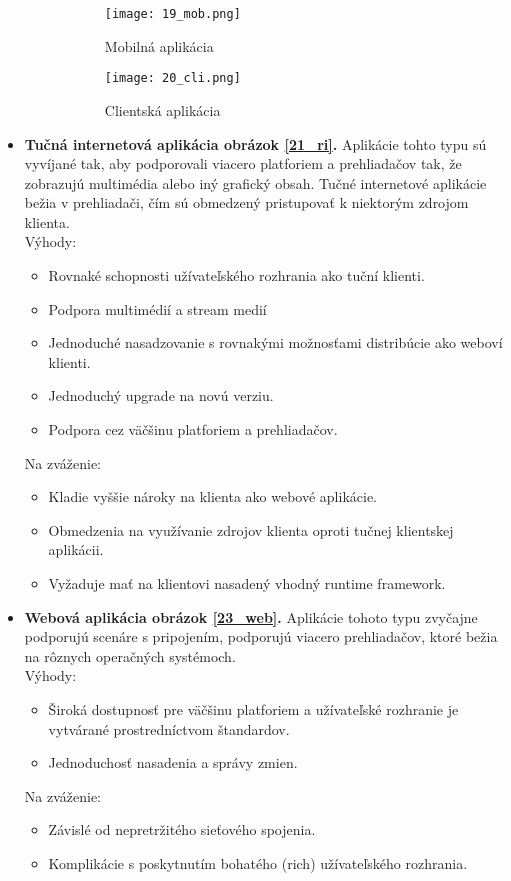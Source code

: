 \begin{itemize}
\begin{figure}[!htbp]
\centering
\begin{subfigure}{0.5\linewidth}
\texttt{[image: 19\_mob.png]}
\caption{Mobilná aplikácia \cite{IOT03}}
\label{19_mob}
\end{subfigure}%
\begin{subfigure}{0.5\linewidth}
\texttt{[image: 20\_cli.png]}
\caption{Clientská aplikácia \cite{IOT03}}
\label{20_cli}
\end{subfigure}
\caption{}
\end{figure}

 
\item
 \textbf{Tučná internetová aplikácia obrázok \ref{21_ri}.} Aplikácie tohto typu sú vyvíjané tak, aby podporovali viacero platforiem a prehliadačov tak, že zobrazujú multimédia alebo iný grafický obsah. Tučné internetové aplikácie bežia v prehliadači, čím sú obmedzený pristupovať k niektorým zdrojom klienta. \\
Výhody: 
 \begin{itemize}
   \item  Rovnaké schopnosti užívateľského rozhrania ako tuční klienti.
   \item  Podpora multimédií a stream medií
   \item  Jednoduché nasadzovanie  s rovnakými možnosťami distribúcie ako weboví klienti. 
   \item Jednoduchý upgrade na novú verziu.
   \item Podpora cez väčšinu platforiem a prehliadačov. 
 \end{itemize}
Na zváženie: 
 \begin{itemize}
   \item Kladie vyššie nároky na klienta ako webové aplikácie.
   \item Obmedzenia na využívanie zdrojov klienta oproti tučnej klientskej aplikácii. 
   \item Vyžaduje mať na klientovi nasadený vhodný runtime framework.
 \end{itemize} 
 
  \item
  \textbf{Webová aplikácia obrázok \ref{23_web}.} Aplikácie tohoto typu zvyčajne podporujú scenáre s pripojením, podporujú viacero prehliadačov, ktoré bežia na rôznych operačných systémoch.\\
Výhody: 
 \begin{itemize}
   \item Široká dostupnosť pre väčšinu platforiem a užívateľské rozhranie je vytvárané prostredníctvom štandardov.
   \item Jednoduchosť nasadenia a správy zmien.
 \end{itemize}
Na zváženie: 
 \begin{itemize}
   \item Závislé od nepretržitého sieťového spojenia.
   \item Komplikácie s poskytnutím bohatého (rich) užívateľského rozhrania.
 \end{itemize}  
 

\end{itemize}
